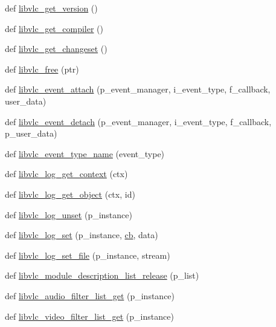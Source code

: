 \begin{DoxyCompactItemize}
\item 
def \hyperlink{namespacevlc_abf0d92070a21456079ca64ef86649828}{libvlc\+\_\+get\+\_\+version} ()
\item 
def \hyperlink{namespacevlc_a10e241078a2da73d9ba308448d3c3192}{libvlc\+\_\+get\+\_\+compiler} ()
\item 
def \hyperlink{namespacevlc_abb66509718afd388f3b587c0e28813fa}{libvlc\+\_\+get\+\_\+changeset} ()
\item 
def \hyperlink{namespacevlc_a517c22313b52ae70f97af003f7ef7d5a}{libvlc\+\_\+free} (ptr)
\item 
def \hyperlink{namespacevlc_a850485fc3bc6fa1c7a93adfd2ac93f2b}{libvlc\+\_\+event\+\_\+attach} (p\+\_\+event\+\_\+manager, i\+\_\+event\+\_\+type, f\+\_\+callback, user\+\_\+data)
\item 
def \hyperlink{namespacevlc_a67ba99f7479ae36483024ec3e8746380}{libvlc\+\_\+event\+\_\+detach} (p\+\_\+event\+\_\+manager, i\+\_\+event\+\_\+type, f\+\_\+callback, p\+\_\+user\+\_\+data)
\item 
def \hyperlink{namespacevlc_aaec28b9045ae171b47c2212bcd8058fa}{libvlc\+\_\+event\+\_\+type\+\_\+name} (event\+\_\+type)
\item 
def \hyperlink{namespacevlc_a9694de9d8c9b9070e0108982c90dd379}{libvlc\+\_\+log\+\_\+get\+\_\+context} (ctx)
\item 
def \hyperlink{namespacevlc_ac7af2ab7238d542708ec0da84c3d3a71}{libvlc\+\_\+log\+\_\+get\+\_\+object} (ctx, id)
\item 
def \hyperlink{namespacevlc_ab8183b479ddf3d672f4044a9a3805b06}{libvlc\+\_\+log\+\_\+unset} (p\+\_\+instance)
\item 
def \hyperlink{namespacevlc_aff40c0e783a0949925936432b4beba34}{libvlc\+\_\+log\+\_\+set} (p\+\_\+instance, \hyperlink{namespacevlc_a48994b0a618061e8aa4b2d314712d3da}{cb}, data)
\item 
def \hyperlink{namespacevlc_aa18225aa223a1abfd7245a682fd599a0}{libvlc\+\_\+log\+\_\+set\+\_\+file} (p\+\_\+instance, stream)
\item 
def \hyperlink{namespacevlc_a3ae49966acbd43a6b3c1b286cf609912}{libvlc\+\_\+module\+\_\+description\+\_\+list\+\_\+release} (p\+\_\+list)
\item 
def \hyperlink{namespacevlc_aff772ccc6681b4466b87298f076e20f5}{libvlc\+\_\+audio\+\_\+filter\+\_\+list\+\_\+get} (p\+\_\+instance)
\item 
def \hyperlink{namespacevlc_a9a36ab0bc4560c42db45708f4c31e1f2}{libvlc\+\_\+video\+\_\+filter\+\_\+list\+\_\+get} (p\+\_\+instance)
\item 

\end{DoxyCompactItemize}
